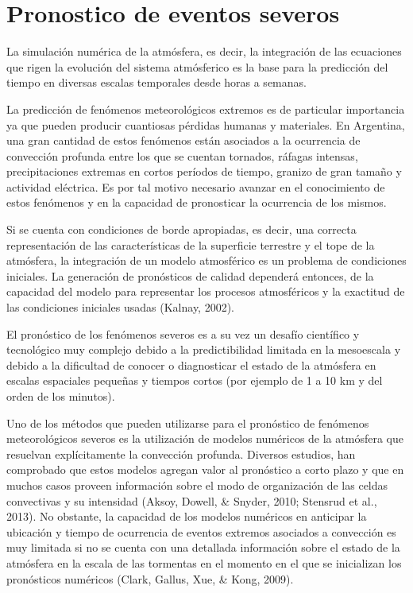\documentclass[12pt,twoside]{reedthesis}
\begin{document}
\hypertarget{pronostico-de-eventos-severos}{%
\section{Pronostico de eventos severos}\label{pronostico-de-eventos-severos}}

La simulación numérica de la atmósfera, es decir, la integración de las ecuaciones que rigen la evolución del sistema atmósferico es la base para la predicción del tiempo en diversas escalas temporales desde horas a semanas.

La predicción de fenómenos meteorológicos extremos es de particular importancia ya que pueden producir cuantiosas pérdidas humanas y materiales. En Argentina, una gran cantidad de estos fenómenos están asociados a la ocurrencia de convección profunda entre los que se cuentan tornados, ráfagas intensas, precipitaciones extremas en cortos períodos de tiempo, granizo de gran tamaño y actividad eléctrica. Es por tal motivo necesario avanzar en el conocimiento de estos fenómenos y en la capacidad de pronosticar la ocurrencia de los mismos.

Si se cuenta con condiciones de borde apropiadas, es decir, una correcta representación de las características de la superficie terrestre y el tope de la atmósfera, la integración de un modelo atmosférico es un problema de condiciones iniciales. La generación de pronósticos de calidad dependerá entonces, de la capacidad del modelo para representar los procesos atmosféricos y la exactitud de las condiciones iniciales usadas (Kalnay, 2002).

El pronóstico de los fenómenos severos es a su vez un desafío científico y tecnológico muy complejo debido a la predictibilidad limitada en la mesoescala y debido a la dificultad de conocer o diagnosticar el estado de la atmósfera en escalas espaciales pequeñas y tiempos cortos (por ejemplo de 1 a 10 km y del orden de los minutos).

Uno de los métodos que pueden utilizarse para el pronóstico de fenómenos meteorológicos severos es la utilización de modelos numéricos de la atmósfera que resuelvan explícitamente la convección profunda. Diversos estudios, han comprobado que estos modelos agregan valor al pronóstico a corto plazo y que en muchos casos proveen información sobre el modo de organización de las celdas convectivas y su intensidad (Aksoy, Dowell, \& Snyder, 2010; Stensrud et al., 2013). No obstante, la capacidad de los modelos numéricos en anticipar la ubicación y tiempo de ocurrencia de eventos extremos asociados a convección es muy limitada si no se cuenta con una detallada información sobre el estado de la atmósfera en la escala de las tormentas en el momento en el que se inicializan los pronósticos numéricos (Clark, Gallus, Xue, \& Kong, 2009).
\end{document}
